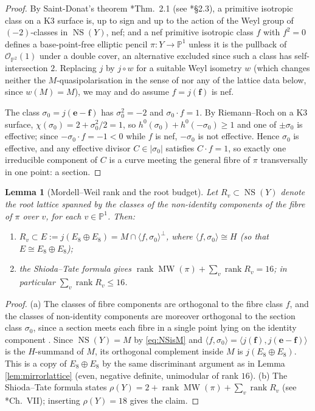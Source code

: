 \documentclass[11pt]{amsart}
\theoremstyle{plain}
\newtheorem{lemma}[theorem]{Lemma}
\theoremstyle{definition}
\newcommand{\Pn}{\mathbb{P}^1}
\newcommand{\NS}{\operatorname{NS}}
\newcommand{\OO}{\mathcal{O}}
\newcommand{\e}{\mathbf{e}}
\newcommand{\ff}{\mathbf{f}}
\begin{document}
\begin{proof}
By Saint-Donat's theorem \cite{SD74}*{Thm.~2.1} (see
\cite{Huy16}*{\S2.3}), a primitive isotropic class on a K3 surface is, up to
sign and up to the action of the Weyl group of $(−2)$-classes in $\NS(Y)$, nef;
and a nef primitive isotropic class $f$ with $f^2=0$ defines a base-point-free
elliptic pencil $\pi\colon Y\to\Pn$ unless it is the pullback of
$\OO_{\mathbb{P}^2}(1)$ under a double cover, an alternative excluded since such
a class has self-intersection $2$. Replacing $j$ by $j\circ w$ for a suitable
Weyl isometry $w$ (which changes neither the $M$-quasipolarisation in the sense
of \cite{Dol96} nor any of the lattice data below, since
$w(M)=M$), we may and do assume $f=j(\ff)$ is nef.

The class $\sigma_0=j(\e-\ff)$ has $\sigma_0^2=-2$ and $\sigma_0\cdot f=1$.
By Riemann--Roch on a K3 surface, $\chi(\sigma_0)=2+\sigma_0^2/2=1$, so
$h^0(\sigma_0)+h^0(-\sigma_0)\geq 1$ and one of $\pm\sigma_0$ is effective;
since $-\sigma_0\cdot f=-1<0$ while $f$ is nef, $-\sigma_0$ is not effective.
Hence $\sigma_0$ is effective, and any effective divisor $C\in|\sigma_0|$
satisfies $C\cdot f=1$, so exactly one irreducible component of $C$ is a curve
meeting the general fibre of $\pi$ transversally in one point: a section.
\end{proof}

\begin{lemma}[Mordell--Weil rank and the root budget]\label{lem:shiodatate}
Let $R_v\subset \NS(Y)$ denote the root lattice spanned by the classes of the
non-identity components of the fibre of $\pi$ over $v$, for each $v\in\Pn$.
Then:
\begin{enumerate}
\item[(a)] $R_v\subset E:=j(E_8\oplus E_8)=M\cap\langle f,\sigma_0\rangle^\perp$,
where $\langle f,\sigma_0\rangle\cong H$ (so that $E\cong E_8\oplus E_8$);
\item[(b)] the Shioda--Tate formula \cite{Shi72,Mir89} gives
$\operatorname{rank}\operatorname{MW}(\pi)+\sum_v\operatorname{rank}R_v=16$;
in particular $\sum_v\operatorname{rank}R_v\leq 16$.
\end{enumerate}
\end{lemma}

\begin{proof}
(a) The classes of fibre components are orthogonal to the fibre class $f$, and
the classes of non-identity components are moreover orthogonal to the section
class $\sigma_0$, since a section meets each fibre in a single point lying on
the identity component \cite{Mir89,Kod63}. Since
$\NS(Y)=M$ by \eqref{eq:NSisM} and $\langle f,\sigma_0\rangle=\langle
j(\ff),j(\e-\ff)\rangle$ is the $H$-summand of $M$, its orthogonal complement
inside $M$ is $j(E_8\oplus E_8)$. This is a copy of $E_8\oplus E_8$ by the same
discriminant argument as in Lemma \ref{lem:mirrorlattice} (even, negative
definite, unimodular of rank $16$).
(b) The Shioda--Tate formula states
$\rho(Y)=2+\operatorname{rank}\operatorname{MW}(\pi)+\sum_v\operatorname{rank}R_v$
\cite{Shi72} (see \cite{Mir89}*{Ch.~VII}); inserting $\rho(Y)=18$ gives the
claim.
\end{proof}
\end{document}
